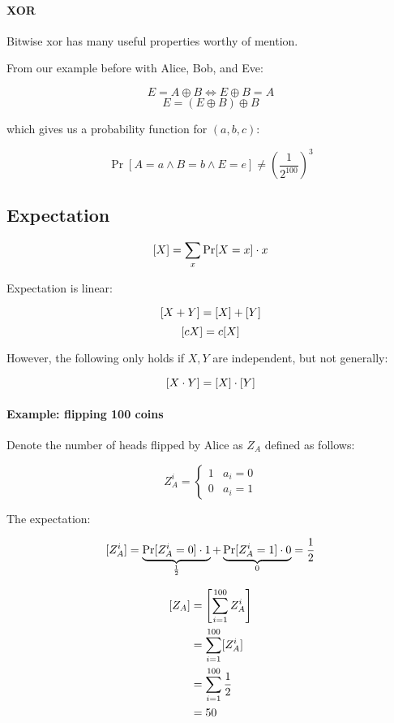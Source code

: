 \documentclass{idc_msc}
\DeclareMathOperator*{\xor}{\oplus}
\let\E\relax
\DeclareMathOperator*{\E}{\mathrm{E}}
\begin{document}
\paragraph{XOR}

Bitwise xor has many useful properties worthy of mention.

From our example before with Alice, Bob, and Eve:

\[
  E = A \xor B \Leftrightarrow E \xor B = A
\]
\[E = (E \xor B) \xor B\]

which gives us a probability function for \((a,b,c)\):

\[
  \Pr[A = a \land B = b \land E = e] \ne \left(\frac{1}{2^{100}}\right)^3
\]

\subsection{Expectation}

\[\E[X] = \sum_x \Pr[X = x] \cdot x\]

Expectation is linear:

\[\E[X+Y] = \E[X] + \E[Y]\]
\[\E[cX] = c \E[X]\]

However, the following only holds if \(X, Y\) are independent, but not generally:

\[\E[X \cdot Y] = \E[X] \cdot \E[Y]\]

\paragraph{Example: flipping 100 coins}

Denote the number of heads flipped by Alice as \(Z_A\) defined as follows:

\[
Z_A^i = \begin{cases}
1 & a_i = 0 \\
0 & a_i = 1
\end{cases}
\]

The expectation:

\[
  \E[Z_A^i] = \underbrace{\Pr[Z_A^i = 0] \cdot 1}_{\frac{1}{2}} + \underbrace{\Pr[Z_A^i=1]\cdot 0}_{0} = \frac{1}{2}
\]

\[
\begin{aligned}
\E[Z_A] &= \E\left[\sum_{i = 1}^{100} Z_A^i\right] \\
&= \sum_{i = 1}^{100} \E[Z_A^i] \\
&= \sum_{i = 1}^{100} \frac{1}{2} \\
&= 50 \\
\end{aligned}
\]
\end{document}
